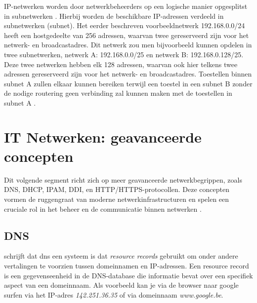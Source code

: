 IP-netwerken worden door netwerkbeheerders op een logische manier opgesplitst in subnetwerken \autocite{Thomas2000}. Hierbij worden de beschikbare IP-adressen verdeeld in subnetwerken (subnet). Het eerder beschreven voorbeeldnetwerk 192.168.0.0/24 heeft een hostgedeelte van 256 adressen, waarvan twee gereserveerd zijn voor het netwerk- en broadcastadres. Dit netwerk zou men bijvoorbeeld kunnen opdelen in twee subnetwerken, netwerk A: 192.168.0.0/25 en netwerk B: 192.168.0.128/25. Deze twee netwerken hebben elk 128 adressen, waarvan ook hier telkens twee adressen gereserveerd zijn voor het netwerk- en broadcastadres.
Toestellen binnen subnet A zullen elkaar kunnen bereiken terwijl een toestel in een subnet B zonder de nodige routering geen verbinding zal kunnen maken met de toestellen in subnet A \autocite{Thomas2000}.

\section{IT Netwerken: geavanceerde concepten}
Dit volgende segment richt zich op meer geavanceerde netwerkbegrippen, zoals DNS, DHCP, IPAM, DDI, en HTTP/HTTPS-protocollen. Deze concepten vormen de ruggengraat van moderne netwerkinfrastructuren en spelen een cruciale rol in het beheer en de communicatie binnen netwerken \autocite{Rooney2020}.

\subsection{DNS}
\textcite{Mockapetris1987} schrijft dat \acrshort{dns} een systeem is dat \textit{resource records} gebruikt om onder andere vertalingen te voorzien tussen domeinnamen en IP-adressen. Een resource record is een gegevenseenheid in de DNS-database die informatie bevat over een specifiek aspect van een domeinnaam. Als voorbeeld kan je via de browser naar google surfen via het IP-adres \textit{142.251.36.35} of via domeinnaam \textit{www.google.be}. 

